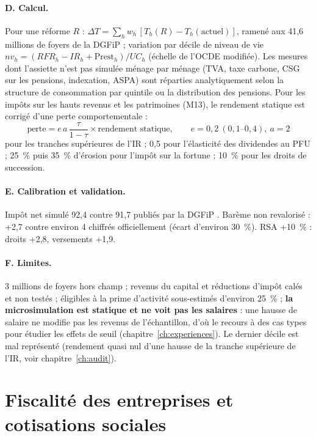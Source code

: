 \paragraph{D. Calcul.} Pour une réforme $R$ : $\Delta T = \sum_h w_h\,[T_h(R) - T_h(\text{actuel})]$, ramené aux 41,6
millions de foyers de la DGFiP ; variation par décile de niveau de vie
$nv_h = (RFR_h - IR_h + \text{Prest}_h)/UC_h$ (échelle de l'OCDE modifiée). Les mesures dont l'assiette n'est pas
simulée ménage par ménage (TVA, taxe carbone, CSG sur les pensions, indexation, ASPA) sont réparties analytiquement
selon la structure de consommation par quintile ou la distribution des pensions. Pour les impôts sur les hauts revenus
et les patrimoines (M13), le rendement statique est corrigé d'une perte comportementale :
\begin{equation}
\text{perte} = e\,a\,\frac{\tau}{1-\tau}\times \text{rendement statique},\qquad e = 0{,}2~(0{,}1\text{--}0{,}4),\ a = 2
\end{equation}
pour les tranches supérieures de l'IR ; 0,5 pour l'élasticité des dividendes au PFU ; 25~\% puis 35~\% d'érosion pour
l'impôt sur la fortune ; 10~\% pour les droits de succession.

\paragraph{E. Calibration et validation.} Impôt net simulé 92,4\md{} contre 91,7\md{} publiés par la DGFiP
. Barème non revalorisé : +2,7\md{} contre environ 4\md{} chiffrés officiellement (écart d'environ 30~\%).
RSA +10~\% : droits +2,8\md, versements +1,9\md.

\paragraph{F. Limites.} 3 millions de foyers hors champ ; revenus du capital et réductions d'impôt calés et non testés ;
éligibles à la prime d'activité sous-estimés d'environ 25~\% ; \textbf{la microsimulation est statique et ne voit pas
les salaires} : une hausse de salaire ne modifie pas les revenus de l'échantillon, d'où le recours à des cas types
pour étudier les effets de seuil (chapitre~\ref{ch:experiences}). Le dernier décile est mal représenté (rendement
quasi nul d'une hausse de la tranche supérieure de l'IR, voir chapitre~\ref{ch:audit}).

\section{Fiscalité des entreprises et cotisations sociales}
\label{sec:fiscent}

